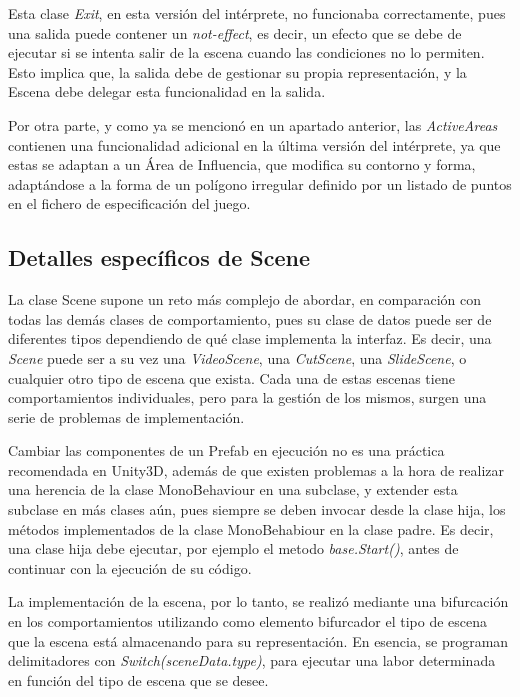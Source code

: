 Esta clase \textit{Exit}, en esta versión del intérprete, no funcionaba correctamente, pues una salida puede contener un \textit{not-effect}, es decir, un efecto que se debe de ejecutar si se intenta salir de la escena cuando las condiciones no lo permiten. Esto implica que, la salida debe de gestionar su propia representación, y la Escena debe delegar esta funcionalidad en la salida.

Por otra parte, y como ya se mencionó en un apartado anterior, las \textit{ActiveAreas} contienen una funcionalidad adicional en la última versión del intérprete, ya que estas se adaptan a un Área de Influencia, que modifica su contorno y forma, adaptándose a la forma de un polígono irregular definido por un listado de puntos en el fichero de especificación del juego.

\subsection{Detalles específicos de Scene}

La clase Scene supone un reto más complejo de abordar, en comparación con todas las demás clases de comportamiento, pues su clase de datos puede ser de diferentes tipos dependiendo de qué clase implementa la interfaz. Es decir, una \textit{Scene} puede ser a su vez una \textit{VideoScene}, una \textit{CutScene}, una \textit{SlideScene}, o cualquier otro tipo de escena que exista. Cada una de estas escenas tiene comportamientos individuales, pero para la gestión de los mismos, surgen una serie de problemas de implementación.

Cambiar las componentes de un Prefab en ejecución no es una práctica recomendada en Unity3D, además de que existen problemas a la hora de realizar una herencia de la clase MonoBehaviour en una subclase, y extender esta subclase en más clases aún, pues siempre se deben invocar desde la clase hija, los métodos implementados de la clase MonoBehabiour en la clase padre. Es decir, una clase hija debe ejecutar, por ejemplo el metodo \textit{base.Start()}, antes de continuar con la ejecución de su código.

La implementación de la escena, por lo tanto, se realizó mediante una bifurcación en los comportamientos utilizando como elemento bifurcador el tipo de escena que la escena está almacenando para su representación. En esencia, se programan delimitadores con \textit{Switch(sceneData.type)}, para ejecutar una labor determinada en función del tipo de escena que se desee.

